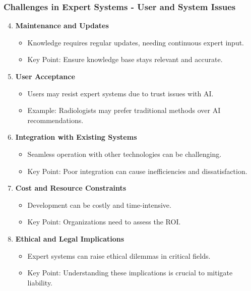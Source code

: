 \documentclass[aspectratio=169]{beamer}
\begin{document}
\begin{frame}[fragile]
    \frametitle{Challenges in Expert Systems - User and System Issues}
    \begin{enumerate}
        \setcounter{enumi}{3}
        \item \textbf{Maintenance and Updates}
            \begin{itemize}
                \item Knowledge requires regular updates, needing continuous expert input.
                \item Key Point: Ensure knowledge base stays relevant and accurate.
            \end{itemize}
        
        \item \textbf{User Acceptance}
            \begin{itemize}
                \item Users may resist expert systems due to trust issues with AI.
                \item Example: Radiologists may prefer traditional methods over AI recommendations.
            \end{itemize}
        
        \item \textbf{Integration with Existing Systems}
            \begin{itemize}
                \item Seamless operation with other technologies can be challenging.
                \item Key Point: Poor integration can cause inefficiencies and dissatisfaction.
            \end{itemize}

        \item \textbf{Cost and Resource Constraints}
            \begin{itemize}
                \item Development can be costly and time-intensive.
                \item Key Point: Organizations need to assess the ROI.
            \end{itemize}
        
        \item \textbf{Ethical and Legal Implications}
            \begin{itemize}
                \item Expert systems can raise ethical dilemmas in critical fields.
                \item Key Point: Understanding these implications is crucial to mitigate liability.
            \end{itemize}
    \end{enumerate}
\end{frame}
\end{document}
